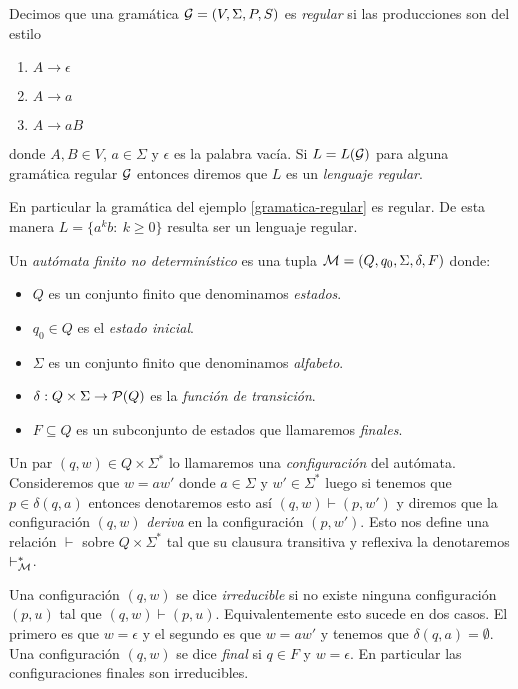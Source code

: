 \documentclass[tesis.tex]{subfiles}
\begin{document}
\begin{deff}
	Decimos que una gramática ${\cal G} = (V, \Sigma, P, S)$ es \emph{regular} si las producciones son del estilo
	\begin{enumerate}
		\item $A \to \epsilon$
		\item $A \to a$
		\item $A \to a B$
	\end{enumerate}
	donde $A, B \in V$, $a \in \Sigma$ y $\epsilon$ es la palabra vacía. 
	Si $L=L({\cal G})$ para alguna gramática regular $\cal G$ entonces diremos que $L$ es un \emph{lenguaje regular}. 
\end{deff}


En particular la gramática del ejemplo \ref{gramatica-regular} es regular. 
De esta manera $L= \{ a^k b : \ k \ge 0  \}$ resulta ser un lenguaje regular.


\begin{deff}
	Un \emph{autómata finito no determinístico} es una tupla ${\cal M} = (Q,q_0,\Sigma,\delta,F)$ donde:
	\begin{itemize}
		\item $Q$ es un conjunto finito que denominamos \emph{estados}.
		\item $q_0 \in Q$ es el \emph{estado inicial}.
		\item $\Sigma$ es un conjunto finito que denominamos \emph{alfabeto}.
		\item $\delta:Q \times \Sigma \to {\cal P}(Q)$ es la \emph{función de transición}.
		\item $F \subseteq Q$ es un subconjunto de estados que llamaremos \emph{finales}.
	\end{itemize}
\end{deff}

Un par $(q,w) \in Q \times \Sigma^*$ lo llamaremos una \emph{configuración} del autómata.
Consideremos que $w = aw'$ donde $a \in \Sigma$ y $w' \in \Sigma^*$ luego si tenemos que $p \in \delta(q,a) $ entonces denotaremos esto así $(q,w) \vdash (p,w')$ y diremos que la configuración $(q,w)$ \emph{deriva} en la configuración $(p,w')$.
Esto nos define una relación $\vdash$ sobre $Q \times \Sigma^*$ tal que su clausura transitiva y reflexiva la denotaremos $\vdash^*_{\cal M}$.

Una configuración $(q,w)$ se dice \emph{irreducible} si no existe ninguna configuración $(p,u)$ tal que $(q,w) \vdash (p,u)$.
Equivalentemente esto sucede en dos casos.
El primero es que $w = \epsilon$ y el segundo es que $w = aw'$ y tenemos que $\delta(q,a) = \emptyset$.
Una configuración $(q,w)$ se dice \emph{final} si $q \in F$ y $w = \epsilon$.
En particular las configuraciones finales son irreducibles.
\end{document}
